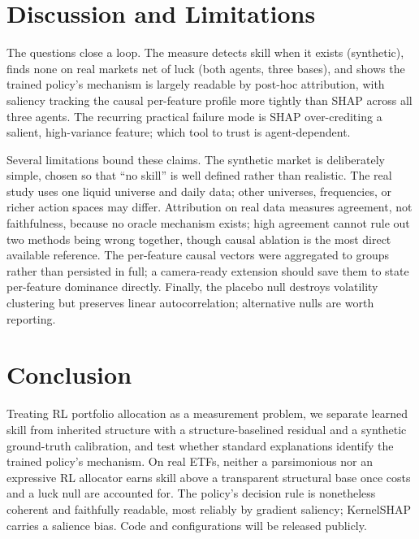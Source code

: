 \documentclass[sigconf,anonymous,review]{acmart}
\begin{document}
\section{Discussion and Limitations}
The questions close a loop. The measure detects skill when it exists (synthetic),
finds none on real markets net of luck (both agents, three bases), and shows the
trained policy's mechanism is largely readable by post-hoc attribution, with saliency
tracking the causal per-feature profile more tightly than SHAP across all three
agents. The recurring practical failure mode is SHAP over-crediting a salient,
high-variance feature; which tool to trust is agent-dependent.

Several limitations bound these claims. The synthetic market is deliberately simple,
chosen so that ``no skill'' is well defined rather than realistic. The real study uses
one liquid universe and daily data; other universes, frequencies, or richer action
spaces may differ. Attribution on real data measures agreement, not faithfulness,
because no oracle mechanism exists; high agreement cannot rule out two methods being
wrong together, though causal ablation is the most direct available reference. The
per-feature causal vectors were aggregated to groups rather than persisted in full; a
camera-ready extension should save them to state per-feature dominance directly.
Finally, the placebo null destroys volatility clustering but preserves linear
autocorrelation; alternative nulls are worth reporting.

\section{Conclusion}
Treating RL portfolio allocation as a measurement problem, we separate learned skill
from inherited structure with a structure-baselined residual and a synthetic
ground-truth calibration, and test whether standard explanations identify the trained
policy's mechanism. On real ETFs, neither a parsimonious nor an expressive RL
allocator earns skill above a transparent structural base once costs and a luck null
are accounted for. The policy's decision rule is nonetheless coherent and faithfully
readable, most reliably by gradient saliency; KernelSHAP carries a salience bias.
Code and configurations will be released publicly.




\appendix
\end{document}
